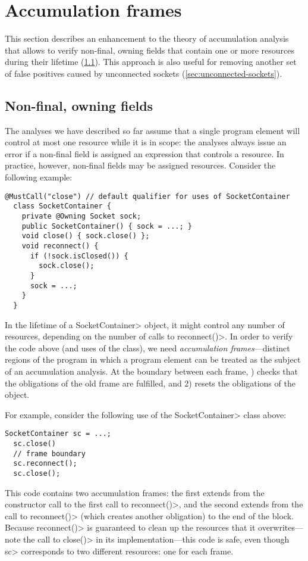 \section{Accumulation frames}
\label{sec:reset-must-call}

This section describes an enhancement to the theory of accumulation
analysis that allows \Tool to verify non-final, owning fields
that contain one or more resources during their lifetime
(\cref{sec:non-final-owning}).
This approach is also useful for
removing another set of false positives caused by unconnected sockets
(\cref{sec:unconnected-sockets}).

\subsection{Non-final, owning fields}
\label{sec:non-final-owning}

The analyses we have described so far assume that a single program
element will control at most one resource while it is in scope:
the analyses always issue an error if a non-final field is assigned an expression
that controls a resource.
In practice, however, non-final fields
may be assigned resources. Consider
the following example:

\begin{lstlisting}[frame=tb,belowskip=3mm]
  @MustCall("close") // default qualifier for uses of SocketContainer
  class SocketContainer {
    private @Owning Socket sock;
    public SocketContainer() { sock = ...; } 
    void close() { sock.close() };
    void reconnect() {
      if (!sock.isClosed()) {
        sock.close();
      }
      sock = ...;
    }
  }
\end{lstlisting}
In the lifetime of a \<SocketContainer> object, it might control any
number of resources, depending on the number of calls to
\<reconnect()>. In order to verify the code above (and uses of the
class), we need \emph{accumulation frames}---distinct regions of the program in
which a program element can be treated as the subject of an
accumulation analysis. At the boundary between each frame, ) checks that the obligations of the old frame are fulfilled, and
2) resets the obligations of the object.

For example, consider the following use of the \<SocketContainer> class
above:

\begin{lstlisting}[frame=tb,belowskip=3mm]
  SocketContainer sc = ...;
  sc.close()
  // frame boundary
  sc.reconnect();
  sc.close();
\end{lstlisting}
This code contains two accumulation frames: the first extends from the
constructor call to the first call to \<reconnect()>, and the second
extends from the call to \<reconnect()> (which creates another
obligation) to the end of the block. Because \<reconnect()> is guaranteed
to clean up the resources that it overwrites---note the call
to \<close()> in its implementation---this code is safe, even though \<sc>
corresponds to two different resources: one for each frame.

